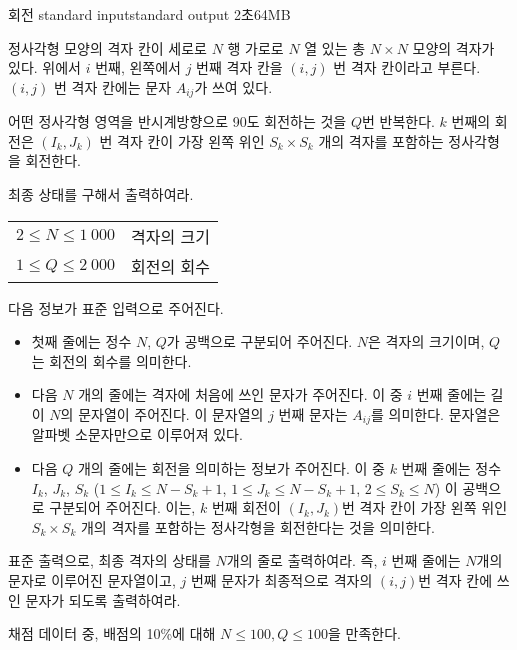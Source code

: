 \begin{problem}{회전}
	{standard input}{standard output}
	{2초}{64MB}{}
	
	정사각형 모양의 격자 칸이 세로로 $N$ 행 가로로 $N$ 열 있는 총 $N \times N$ 모양의 격자가 있다. 위에서 $i$ 번째, 왼쪽에서 $j$ 번째 격자 칸을 $(i, j)$ 번 격자 칸이라고 부른다. $(i, j)$ 번 격자 칸에는 문자 $A_{ij}$가 쓰여 있다.
	
	어떤 정사각형 영역을 반시계방향으로 90도 회전하는 것을 $Q$번 반복한다. $k$ 번째의 회전은 $(I_k, J_k)$ 번 격자 칸이 가장 왼쪽 위인 $S_k \times S_k$ 개의 격자를 포함하는 정사각형을 회전한다.
	
	최종 상태를 구해서 출력하여라.
	
	
	\Constraints
	
	
	\begin{tabular}{ll}
		$2 \le N \le 1\ 000$ & 격자의 크기 \\
		$1 \le Q \le 2\ 000$ & 회전의 회수 \\
	\end{tabular}
	
	
	\InputFile
	
	다음 정보가 표준 입력으로 주어진다.
	
	\begin{itemize}
		\item 첫째 줄에는 정수 $N$, $Q$가 공백으로 구분되어 주어진다. $N$은 격자의 크기이며, $Q$는 회전의 회수를 의미한다.
		
		\item 다음 $N$ 개의 줄에는 격자에 처음에 쓰인 문자가 주어진다. 이 중 $i$ 번째 줄에는 길이 $N$의 문자열이 주어진다. 이 문자열의 $j$ 번째 문자는 $A_{ij}$를 의미한다. 문자열은 알파벳 소문자만으로 이루어져 있다.
		
		\item 다음 $Q$ 개의 줄에는 회전을 의미하는 정보가 주어진다. 이 중 $k$ 번째 줄에는 정수 $I_k$, $J_k$, $S_k$ ($1 \le  I_k \le N-S_k+1$, $1 \le J_k \le N-S_k+1$, $2 \le S_k \le N$) 이 공백으로 구분되어 주어진다. 이는, $k$ 번째 회전이 $(I_k, J_k)$번 격자 칸이 가장 왼쪽 위인 $S_k \times S_k$ 개의 격자를 포함하는 정사각형을 회전한다는 것을 의미한다.
	\end{itemize}
	
	
	\OutputFile
	
	표준 출력으로, 최종 격자의 상태를 $N$개의 줄로 출력하여라. 즉, $i$ 번째 줄에는 $N$개의 문자로 이루어진 문자열이고, $j$ 번째 문자가 최종적으로 격자의 $(i, j)$번 격자 칸에 쓰인 문자가 되도록 출력하여라.
	\Scoring
	
	채점 데이터 중, 배점의 10\%에 대해 $N \le 100, Q \le 100$을 만족한다.
	

\end{problem}

